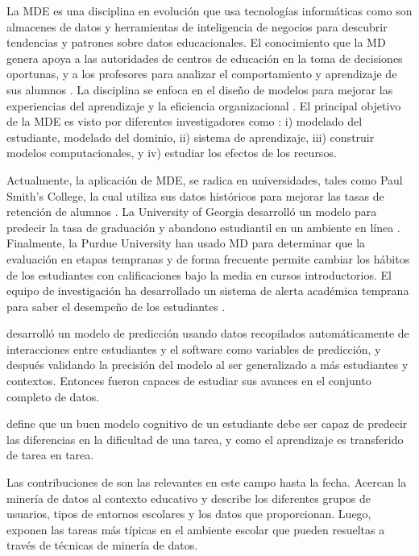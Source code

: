 La MDE es una disciplina en evolución que usa tecnologías informáticas como son almacenes de datos y herramientas de inteligencia de negocios para descubrir tendencias y patrones sobre datos educacionales. El conocimiento que la MD genera apoya a las autoridades de centros de educación en la toma de decisiones oportunas, y a los profesores para analizar el comportamiento y aprendizaje de sus alumnos \cite{romero2010educational}. La disciplina se enfoca en el diseño de modelos para mejorar las experiencias del aprendizaje y la eficiencia organizacional \cite{pandey2013decision}. El principal objetivo de la MDE es visto por diferentes investigadores como \cite{merceron2005educational,kumar2015comprehensive,romero2010educational}: i) modelado del estudiante, modelado del dominio, ii) sistema de aprendizaje, iii) construir modelos computacionales, y iv) estudiar los efectos de los recursos.

Actualmente, la aplicación de MDE, se radica en universidades, tales como Paul Smith’s College, la cual utiliza sus datos históricos para mejorar las tasas de retención de alumnos \cite{bichsel2012analytics}. La University of Georgia desarrolló un modelo para predecir la tasa de graduación y abandono estudiantil en un ambiente en línea \cite{morris2005predicting}.  Finalmente, la Purdue University han usado MD para determinar que la evaluación en etapas tempranas y de forma frecuente permite cambiar los hábitos de los estudiantes con calificaciones bajo la media en cursos introductorios. El equipo de investigación ha desarrollado un sistema de alerta académica temprana para saber el desempeño de los estudiantes \cite{baepler2010academic}. 

\textcite{baker2010data} desarrolló un modelo de predicción usando datos recopilados automáticamente de interacciones entre estudiantes y el software como variables de predicción, y después validando la precisión del modelo al ser generalizado a más estudiantes y contextos. Entonces fueron capaces de estudiar sus avances en el conjunto completo de datos. 

\textcite{koedinger2015data} define que un buen modelo cognitivo de un estudiante debe ser capaz de predecir las diferencias en la dificultad de una tarea, y como el aprendizaje es transferido de tarea en tarea.

Las contribuciones de \textcite{romero2013data} son las relevantes en este campo hasta la fecha. Acercan la minería de datos al contexto educativo y describe los diferentes grupos de usuarios, tipos de entornos escolares y los datos que proporcionan. Luego, exponen las tareas más típicas en el ambiente escolar que pueden resueltas a través de técnicas de minería de datos.

